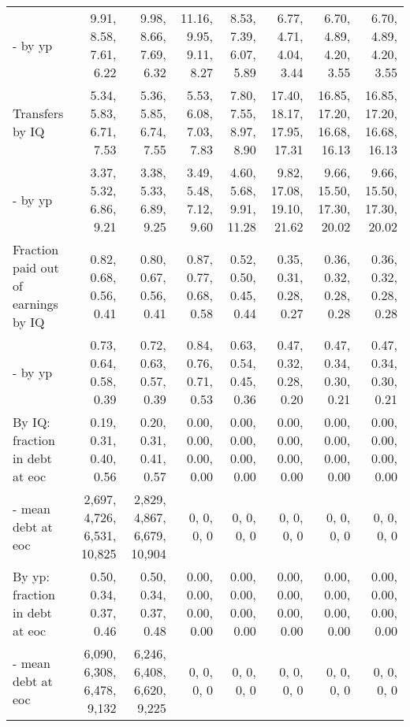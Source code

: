 \begin{tabular}{lrrrrrrr}
- by yp & 9.91, 8.58, 7.61, 6.22  & 9.98, 8.66, 7.69, 6.32  & 11.16, 9.95, 9.11, 8.27  & 8.53, 7.39, 6.07, 5.89  & 6.77, 4.71, 4.04, 3.44  & 6.70, 4.89, 4.20, 3.55  & 6.70, 4.89, 4.20, 3.55  \\ 
Transfers by IQ & 5.34, 5.83, 6.71, 7.53  & 5.36, 5.85, 6.74, 7.55  & 5.53, 6.08, 7.03, 7.83  & 7.80, 7.55, 8.97, 8.90  & 17.40, 18.17, 17.95, 17.31  & 16.85, 17.20, 16.68, 16.13  & 16.85, 17.20, 16.68, 16.13  \\ 
- by yp & 3.37, 5.32, 6.86, 9.21  & 3.38, 5.33, 6.89, 9.25  & 3.49, 5.48, 7.12, 9.60  & 4.60, 5.68, 9.91, 11.28  & 9.82, 17.08, 19.10, 21.62  & 9.66, 15.50, 17.30, 20.02  & 9.66, 15.50, 17.30, 20.02  \\ 
Fraction paid out of earnings by IQ & 0.82, 0.68, 0.56, 0.41  & 0.80, 0.67, 0.56, 0.41  & 0.87, 0.77, 0.68, 0.58  & 0.52, 0.50, 0.45, 0.44  & 0.35, 0.31, 0.28, 0.27  & 0.36, 0.32, 0.28, 0.28  & 0.36, 0.32, 0.28, 0.28  \\ 
- by yp & 0.73, 0.64, 0.58, 0.39  & 0.72, 0.63, 0.57, 0.39  & 0.84, 0.76, 0.71, 0.53  & 0.63, 0.54, 0.45, 0.36  & 0.47, 0.32, 0.28, 0.20  & 0.47, 0.34, 0.30, 0.21  & 0.47, 0.34, 0.30, 0.21  \\ 
By IQ: fraction in debt at eoc & 0.19, 0.31, 0.40, 0.56  & 0.20, 0.31, 0.41, 0.57  & 0.00, 0.00, 0.00, 0.00  & 0.00, 0.00, 0.00, 0.00  & 0.00, 0.00, 0.00, 0.00  & 0.00, 0.00, 0.00, 0.00  & 0.00, 0.00, 0.00, 0.00  \\ 
- mean debt at eoc & 2,697, 4,726, 6,531, 10,825  & 2,829, 4,867, 6,679, 10,904  & 0, 0, 0, 0  & 0, 0, 0, 0  & 0, 0, 0, 0  & 0, 0, 0, 0  & 0, 0, 0, 0  \\ 
By yp: fraction in debt at eoc & 0.50, 0.34, 0.37, 0.46  & 0.50, 0.34, 0.37, 0.48  & 0.00, 0.00, 0.00, 0.00  & 0.00, 0.00, 0.00, 0.00  & 0.00, 0.00, 0.00, 0.00  & 0.00, 0.00, 0.00, 0.00  & 0.00, 0.00, 0.00, 0.00  \\ 
- mean debt at eoc & 6,090, 6,308, 6,478, 9,132  & 6,246, 6,408, 6,620, 9,225  & 0, 0, 0, 0  & 0, 0, 0, 0  & 0, 0, 0, 0  & 0, 0, 0, 0  & 0, 0, 0, 0  \\ 
\hline
\end{tabular}%
